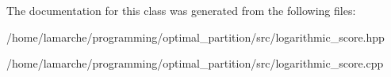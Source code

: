 The documentation for this class was generated from the following files\-:\begin{DoxyCompactItemize}
\item 
/home/lamarche/programming/optimal\-\_\-partition/src/logarithmic\-\_\-score.\-hpp\item 
/home/lamarche/programming/optimal\-\_\-partition/src/logarithmic\-\_\-score.\-cpp\end{DoxyCompactItemize}
